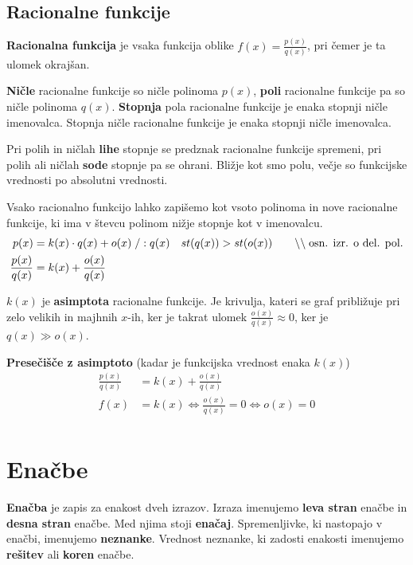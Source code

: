 \documentclass[a4paper,oneside,12pt,fleqn]{article}
\newcommand\krat\cdot
\newcommand{\comment}[1]{\ensuremath{\qquad\backslash\backslash\;}\textnormal{#1}}
\renewcommand\iff\Leftrightarrow
\numberwithin{equation}{section}
\begin{document}
\subsection{Racionalne funkcije}
\label{sec:fun:rac}
\textbf{Racionalna funkcija} je vsaka funkcija oblike $f(x) = \frac{p(x)}{q(x)}$, pri čemer je ta
ulomek okrajšan.

\textbf{Ničle} racionalne funkcije so ničle polinoma $p(x)$, \textbf{poli} racionalne funkcije pa so ničle
polinoma $q(x)$. \textbf{Stopnja} pola racionalne funkcije je enaka stopnji ničle
imenovalca. Stopnja ničle racionalne funkcije je enaka stopnji ničle imenovalca.

Pri polih in ničlah \textbf{lihe} stopnje se predznak racionalne funkcije spremeni, pri polih ali
ničlah \textbf{sode} stopnje pa se ohrani. Bližje kot smo polu, večje so funkcijske
vrednosti po absolutni vrednosti.

Vsako racionalno funkcijo lahko zapišemo kot vsoto polinoma in nove racionalne funkcije,
ki ima v števcu polinom nižje stopnje kot v imenovalcu.
\begin{align*}
    p(x) &= k(x) \krat q(x) + o(x) \; /:q(x)  \quad st(q(x)) > st(o(x)) \comment{osn. izr. o
    del. pol.} \\
    \frac{p(x)}{q(x)} &= k(x) + \frac{o(x)}{q(x)} 
\end{align*}

$k(x)$ je \textbf{asimptota} racionalne funkcije. Je krivulja, kateri se graf približuje pri zelo
velikih in majhnih $x$-ih, ker je takrat ulomek $\frac{o(x)}{q(x)} \approx 0$, ker je $q(x)
\gg o(x)$.

\textbf{Presečišče z asimptoto} (kadar je funkcijska vrednost enaka $k(x)$)
\begin{align*}
    \frac{p(x)}{q(x)} &= k(x) + \frac{o(x)}{q(x)} \\
    f(x) &= k(x) \iff \frac{o(x)}{q(x)} = 0 \iff o(x) = 0 \\
\end{align*}

\section{Enačbe}
\label{sec:enac}
\textbf{Enačba} je zapis za enakost dveh izrazov. Izraza imenujemo \textbf{leva stran}
enačbe in \textbf{desna stran}
enačbe. Med njima stoji \textbf{enačaj}. Spremenljivke, ki nastopajo v enačbi, imenujemo
\textbf{neznanke}.
Vrednost neznanke, ki zadosti enakosti imenujemo \textbf{rešitev} ali \textbf{koren} enačbe.
\end{document}
